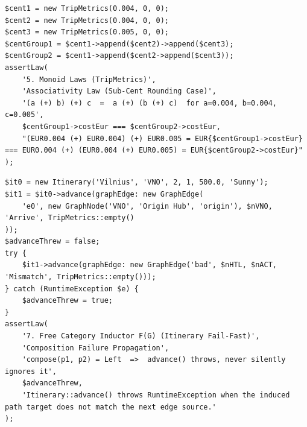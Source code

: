 \begin{lstlisting}[caption={Regression for the sub-cent monoid associativity defect},label={lst:app-test2},firstnumber=195]
$cent1 = new TripMetrics(0.004, 0, 0);
$cent2 = new TripMetrics(0.004, 0, 0);
$cent3 = new TripMetrics(0.005, 0, 0);
$centGroup1 = $cent1->append($cent2)->append($cent3);
$centGroup2 = $cent1->append($cent2->append($cent3));
assertLaw(
    '5. Monoid Laws (TripMetrics)',
    'Associativity Law (Sub-Cent Rounding Case)',
    '(a (+) b) (+) c  =  a (+) (b (+) c)  for a=0.004, b=0.004, c=0.005',
    $centGroup1->costEur === $centGroup2->costEur,
    "(EUR0.004 (+) EUR0.004) (+) EUR0.005 = EUR{$centGroup1->costEur} === EUR0.004 (+) (EUR0.004 (+) EUR0.005) = EUR{$centGroup2->costEur}"
);
\end{lstlisting}

\begin{lstlisting}[caption={Regression for the swallowed graph-composition-failure defect},label={lst:app-test3},firstnumber=263]
$it0 = new Itinerary('Vilnius', 'VNO', 2, 1, 500.0, 'Sunny');
$it1 = $it0->advance(graphEdge: new GraphEdge(
    'e0', new GraphNode('VNO', 'Origin Hub', 'origin'), $nVNO, 'Arrive', TripMetrics::empty()
));
$advanceThrew = false;
try {
    $it1->advance(graphEdge: new GraphEdge('bad', $nHTL, $nACT, 'Mismatch', TripMetrics::empty()));
} catch (RuntimeException $e) {
    $advanceThrew = true;
}
assertLaw(
    '7. Free Category Inductor F(G) (Itinerary Fail-Fast)',
    'Composition Failure Propagation',
    'compose(p1, p2) = Left  =>  advance() throws, never silently ignores it',
    $advanceThrew,
    'Itinerary::advance() throws RuntimeException when the induced path target does not match the next edge source.'
);
\end{lstlisting}
